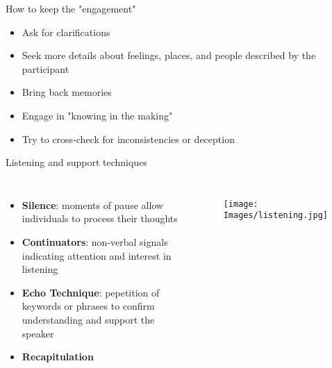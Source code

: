 \documentclass[10pt, aspectratio=169]{beamer}
\begin{document}
\begin{frame}{How to keep the "engagement"}
            \begin{itemize}
                \item Ask for clarifications\vspace{0.3cm}
                \item Seek more details about feelings, places, and people described by the participant\vspace{0.3cm}
                \item Bring back memories\vspace{0.3cm}
                \item Engage in "knowing in the making"\vspace{0.3cm}
                \item Try to cross-check for inconsistencies or deception\vspace{0.3cm}
            \end{itemize}    
\end{frame}

\begin{frame}{Listening and support techniques}
\begin{columns}
    \begin{itemize}
        \item \textbf{Silence}: moments of pause allow individuals to process their thoughts\vspace{0.3cm}
        \item \textbf{Continuators}: non-verbal signals indicating attention and interest in listening\vspace{0.3cm}
        \item \textbf{Echo Technique}: pepetition of keywords or phrases to confirm understanding and support the speaker\vspace{0.3cm}
        \item \textbf{Recapitulation}
    \end{itemize}
\begin{figure}
    \centering
    \texttt{[image: Images/listening.jpg]}
    \label{fig:enter-label}
\end{figure}
\end{columns}
\end{frame}
\end{document}
